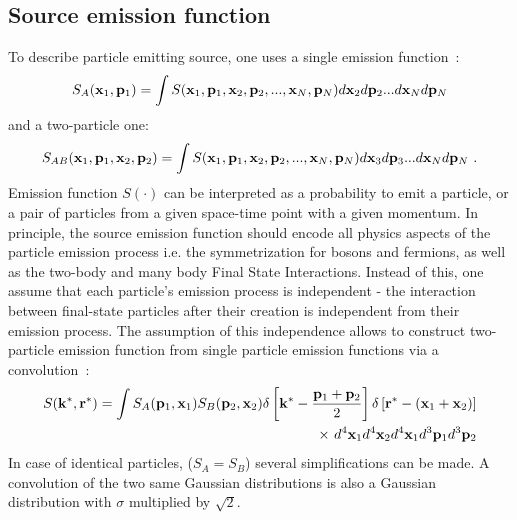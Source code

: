     \subsection{Source emission function}
      To describe particle emitting source, one uses a single emission function~\cite{nonidfemto}:
      \begin{equation}
        \label{eq:source-single-3d}
        S_A(\mathbf{x}_1,\mathbf{p}_1) = \int S(\mathbf{x}_1,\mathbf{p}_1,\mathbf{x}_2,\mathbf{p}_2,...,\mathbf{x}_N,\mathbf{p}_N)
        d \mathbf{x}_2 d \mathbf{p}_2 ... d \mathbf{x}_N d \mathbf{p}_N
      \end{equation}
      and a two-particle one:
      \begin{equation}
        \label{eq:source-two-3d}
        S_{AB}(\mathbf{x}_1,\mathbf{p}_1,\mathbf{x}_2,\mathbf{p}_2) = \int S(\mathbf{x}_1,\mathbf{p}_1,\mathbf{x}_2,\mathbf{p}_2,...,\mathbf{x}_N,\mathbf{p}_N)
        d \mathbf{x}_3 d \mathbf{p}_3 ... d \mathbf{x}_N d \mathbf{p}_N~.
      \end{equation}
      Emission function $S(\cdot)$ can be interpreted as a probability to emit a particle, or a pair of particles from a given space-time point with a given momentum.
      In principle, the source emission function should encode all physics aspects of the particle emission process i.e. the symmetrization for bosons and fermions, as well as the two-body and many body Final State Interactions.
      Instead of this, one assume that each particle's emission process is independent - the interaction between final-state particles after their creation is independent from their emission process.
      The assumption of this independence allows to construct two-particle emission function from single particle emission functions via a convolution~\cite{nonidfemto}:
      \begin{equation}
        \label{eq:source-two-conv}
        \begin{split}
          S(\mathbf{k}^{*},\mathbf{r}^{*}) = \int S_A ( \mathbf{p}_1, \mathbf{x}_1 ) S_B ( \mathbf{p}_2, \mathbf{x}_2 )
          \delta \left[\mathbf{k}^{*} - \frac{\mathbf{p}_1+\mathbf{p}_2}{2} \right]
          \delta \left[\mathbf{r}^{*} - (\mathbf{x}_1+\mathbf{x}_2) \right] \\
          \times~d^4 \mathbf{x}_1 d^4 \mathbf{x}_2 d^4 \mathbf{x}_1 d^3 \mathbf{p}_1 d^3 \mathbf{p}_2
        \end{split}
      \end{equation}
      In case of identical particles, ($S_A = S_B$) several simplifications can be made.
      A convolution of the two same Gaussian distributions is also a Gaussian distribution with $\sigma$ multiplied by $\sqrt{2}$.

